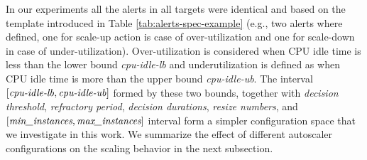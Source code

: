 
In our experiments all the alerts in all targets were identical and based on the template introduced in Table \ref{tab:alerts-spec-example} (e.g., two alerts where defined, one for scale-up action is case of over-utilization and one for scale-down in case of under-utilization).
Over-utilization is considered when CPU idle time is less than the lower bound \textit{cpu-idle-lb} and underutilization is defined as when CPU idle time is more than the upper bound \textit{cpu-idle-ub}.
The interval $[\text{\textit{cpu-idle-lb}},\text{\textit{cpu-idle-ub}}]$ formed by these two bounds, together with {\it decision threshold}, {\it refractory period}, {\it decision durations}, {\it resize numbers}, and $[\text{{\it min\_instances}},\text{{\it max\_instances}}]$ interval form a simpler configuration space that we investigate in this work. 
We summarize the effect of different autoscaler configurations on the scaling behavior in the next subsection.

